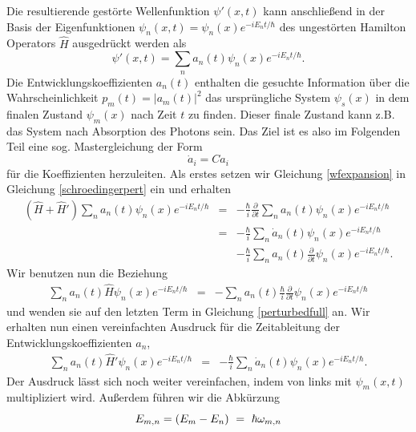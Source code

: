 \documentclass[a4paper,12pt]{article}
\begin{document}
Die resultierende gestörte Wellenfunktion $\psi'(x,t)$ kann anschließend in der Basis der Eigenfunktionen $\psi_n(x,t)=\psi_n(x) e^{-iE_nt/\hbar}$ des ungestörten Hamilton Operators $\hat{H}$ ausgedrückt werden als
\begin{equation}\label{wfexpansion}
 \psi'(x,t)=\sum_n a_n(t) \psi_n(x) e^{-iE_nt/\hbar}.
\end{equation}
Die Entwicklungskoeffizienten $a_n(t)$ enthalten die gesuchte Information über die Wahrscheinlichkeit $p_m(t)=|a_m(t)|^2$ das ursprüngliche System $\psi_s(x)$ in dem finalen Zustand $\psi_m(x)$ 
nach Zeit $t$ zu finden. Dieser finale Zustand kann z.B. das System nach Absorption des Photons sein. Das Ziel ist es also im Folgenden Teil eine sog. Mastergleichung der Form
\begin{equation}
 \dot{a}_i=C a_i
\end{equation}
für die Koeffizienten herzuleiten. Als erstes setzen wir Gleichung \ref{wfexpansion} in Gleichung \ref{schroedingerpert} ein und erhalten
\begin{eqnarray}\label{perturbedfull}
  (\hat{H}+\hat{H}')\sum_n a_n(t) \psi_n(x) e^{-iE_nt/\hbar}&=&-\frac{\hbar}{i}\frac{\partial}{\partial t}\sum_n a_n(t) \psi_n(x) e^{-iE_nt/\hbar} \nonumber\\
              &=&-\frac{\hbar}{i}\sum_n \dot{a}_n(t) \psi_n(x) e^{-iE_nt/\hbar} \nonumber \\
              & &-\frac{\hbar}{i}\sum_n a_n(t) \frac{\partial}{\partial t} \psi_n(x) e^{-iE_nt/\hbar}.
\end{eqnarray}
Wir benutzen nun die Beziehung
\begin{eqnarray}\label{perturbedfull2}
  \sum_n a_n(t) \hat{H} \psi_n(x) e^{-iE_nt/\hbar} & =&-\sum_n a_n(t) \frac{\hbar}{i} \frac{\partial}{\partial t} \psi_n(x) e^{-iE_nt/\hbar}
\end{eqnarray}
und wenden sie auf den letzten Term in Gleichung \ref{perturbedfull} an. Wir erhalten nun einen vereinfachten Ausdruck für die Zeitableitung der Entwicklungskoeffizienten $a_n$,
\begin{eqnarray}
  \sum_n a_n(t)  \hat{H}'\psi_n(x) e^{-iE_nt/\hbar}&=&-\frac{\hbar}{i}\sum_n \dot{a}_n(t) \psi_n(x) e^{-iE_nt/\hbar}. 
\end{eqnarray}
Der Ausdruck lässt sich noch weiter vereinfachen, indem von links mit $\psi_m(x,t)$ multipliziert wird. Außerdem führen wir die Abkürzung
\begin{equation}
 E_{m,n} = (E_m-E_n)~=~\hbar\omega_{m,n}\nonumber\\ 
\end{equation}
\end{document}

